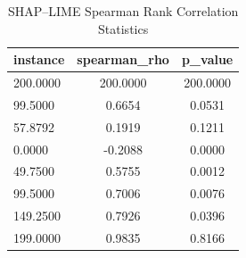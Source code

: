 \begin{table}
\centering
\caption{SHAP–LIME Spearman Rank Correlation Statistics}
\label{tab:agreement}
\begin{tabular}{lcc}
\toprule
instance & spearman_rho & p_value \\
\midrule
200.0000 & 200.0000 & 200.0000 \\
99.5000 & 0.6654 & 0.0531 \\
57.8792 & 0.1919 & 0.1211 \\
0.0000 & -0.2088 & 0.0000 \\
49.7500 & 0.5755 & 0.0012 \\
99.5000 & 0.7006 & 0.0076 \\
149.2500 & 0.7926 & 0.0396 \\
199.0000 & 0.9835 & 0.8166 \\
\bottomrule
\end{tabular}
\end{table}
